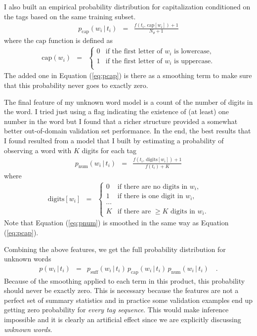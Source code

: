 \documentclass[11pt]{article}
\newcommand{\eq}[1]{Equation (\ref{eq:#1})}
\newcommand{\eqlabel}[1]{\label{eq:#1}}
\begin{document}
I also built an empirical probability distribution for capitalization
conditioned on the tags based on the same training subset.
\begin{eqnarray}\eqlabel{pcap}
p_\mathrm{cap} (w_i\,|\,t_i) &=&
    \frac{f(t_i,\,\mathrm{cap}[w_i])+1}{N_\theta+1}
\end{eqnarray}
where the $\mathrm{cap}$ function is defined as
\begin{eqnarray}
\mathrm{cap}(w_i) &=& \left \{ \begin{array}{ll}
    0 & \mbox{if the first letter of $w_i$ is lowercase,} \\
    1 & \mbox{if the first letter of $w_i$ is uppercase.} \\
\end{array}\right .
\end{eqnarray}
The added one in \eq{pcap} is there as a smoothing term to make sure that this
probability never goes to exactly zero.

The final feature of my unknown word model is a count of the number of digits
in the word.
I tried just using a flag indicating the existence of (at least) one number in
the word but I found that a richer structure provided a somewhat better
out-of-domain validation set performance.
In the end, the best results that I found resulted from a model that I built
by estimating a probability of observing a word with $K$ digits for each tag
\begin{eqnarray}\eqlabel{pnum}
p_\mathrm{num}(w_i\,|\,t_i) &=&
    \frac{f(t_i,\,\mathrm{digits}[w_i])+1}{f(t_i)+K}
\end{eqnarray}
where
\begin{eqnarray}
\mathrm{digits}[w_i] &=& \left \{ \begin{array}{ll}
    0 & \mbox{if there are no digits in $w_i$,} \\
    1 & \mbox{if there is one digit in $w_i$,} \\
    \cdots & \\
    K & \mbox{if there are $\ge K$ digits in $w_i$.}
\end{array}\right.
\end{eqnarray}
Note that \eq{pnum} is smoothed in the same way as \eq{pcap}.

Combining the above features, we get the full probability distribution for
unknown words
\begin{eqnarray}\eqlabel{pfull}
p(w_i\,|\,t_i) &=& p_\mathrm{suff}(w_i\,|\,t_i) \,
                   p_\mathrm{cap}(w_i\,|\,t_i) \,
                   p_\mathrm{num}(w_i\,|\,t_i) \quad.
\end{eqnarray}
Because of the smoothing applied to each term in this product, this
probability should never be exactly zero.
This is necessary because the features are not a perfect set of summary
statistics and in practice some validation examples end up getting zero
probability for \emph{every tag sequence}.
This would make inference impossible and it is clearly an artificial effect
since we are explicitly discussing \emph{unknown words}.
\end{document}
